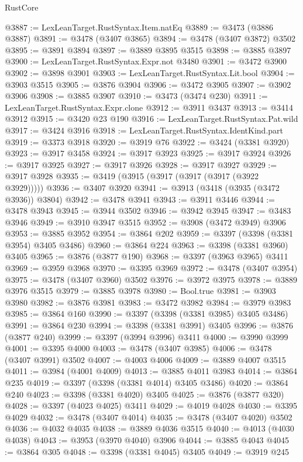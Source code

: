 \begin{lexlean}{RustCore}
\begin{coremodule}
@3887 := LexLeanTarget.RustSyntax.Item.natEq
@3889 := @3473 (@3886 @3887)
@3891 := @3478 (@3407 @3865)
@3894 := @3478 (@3407 @3872) @3502
@3895 := @3891 @3894
@3897 := @3889 @3895 @3515
@3898 := @3885 @3897
@3900 := LexLeanTarget.RustSyntax.Expr.not @3480
@3901 := @3472 @3900
@3902 := @3898 @3901
@3903 := LexLeanTarget.RustSyntax.Lit.bool
@3904 := @3903 @3515
@3905 := @3876 @3904
@3906 := @3472 @3905
@3907 := @3902 @3906
@3908 := @3885 @3907
@3910 := @3473 (@3474 @230)
@3911 := LexLeanTarget.RustSyntax.Expr.clone
@3912 := @3911 @3437
@3913 := @3414 @3912
@3915 := @3420 @23 @190
@3916 := LexLeanTarget.RustSyntax.Pat.wild
@3917 := @3424 @3916
@3918 := LexLeanTarget.RustSyntax.IdentKind.part
@3919 := @3373 @3918
@3920 := @3919 @76
@3922 := @3424 (@3381 @3920)
@3923 := @3917 @3458
@3924 := @3917 @3923
@3925 := @3917 @3924
@3926 := @3917 @3925
@3927 := @3917 @3926
@3928 := @3917 @3927
@3929 := @3917 @3928
@3935 := @3419 (@3915 (@3917 (@3917 (@3917 (@3922 @3929)))))
@3936 := @3407 @3920
@3941 := @3913 (@3418 (@3935 (@3472 @3936)) @3804)
@3942 := @3478 @3941
@3943 := @3911 @3446
@3944 := @3478 @3943
@3945 := @3944 @3502
@3946 := @3942 @3945
@3947 := @3483 @3946
@3949 := @3910 @3947 @3515
@3952 := @3908 (@3472 @3949) @3906
@3953 := @3885 @3952
@3954 := @3864 @202
@3959 := @3397 (@3398 (@3381 @3954) @3405 @3486)
@3960 := @3864 @224
@3963 := @3398 (@3381 @3960) @3405
@3965 := @3876 (@3877 @190)
@3968 := @3397 (@3963 @3965) @3411
@3969 := @3959 @3968
@3970 := @3395 @3969
@3972 := @3478 (@3407 @3954)
@3975 := @3478 (@3407 @3960) @3502
@3976 := @3972 @3975
@3978 := @3889 @3976 @3515
@3979 := @3885 @3978
@3980 := Bool.true
@3981 := @3903 @3980
@3982 := @3876 @3981
@3983 := @3472 @3982
@3984 := @3979 @3983
@3985 := @3864 @160
@3990 := @3397 (@3398 (@3381 @3985) @3405 @3486)
@3991 := @3864 @230
@3994 := @3398 (@3381 @3991) @3405
@3996 := @3876 (@3877 @240)
@3999 := @3397 (@3994 @3996) @3411
@4000 := @3990 @3999
@4001 := @3395 @4000
@4003 := @3478 (@3407 @3985)
@4006 := @3478 (@3407 @3991) @3502
@4007 := @4003 @4006
@4009 := @3889 @4007 @3515
@4011 := @3984 (@4001 @4009)
@4013 := @3885 @4011 @3983
@4014 := @3864 @235
@4019 := @3397 (@3398 (@3381 @4014) @3405 @3486)
@4020 := @3864 @240
@4023 := @3398 (@3381 @4020) @3405
@4025 := @3876 (@3877 @320)
@4028 := @3397 (@4023 @4025) @3411
@4029 := @4019 @4028
@4030 := @3395 @4029
@4032 := @3478 (@3407 @4014)
@4035 := @3478 (@3407 @4020) @3502
@4036 := @4032 @4035
@4038 := @3889 @4036 @3515
@4040 := @4013 (@4030 @4038)
@4043 := @3953 (@3970 @4040) @3906
@4044 := @3885 @4043
@4045 := @3864 @305
@4048 := @3398 (@3381 @4045) @3405
@4049 := @3919 @245

\end{coremodule}
\end{lexlean}
